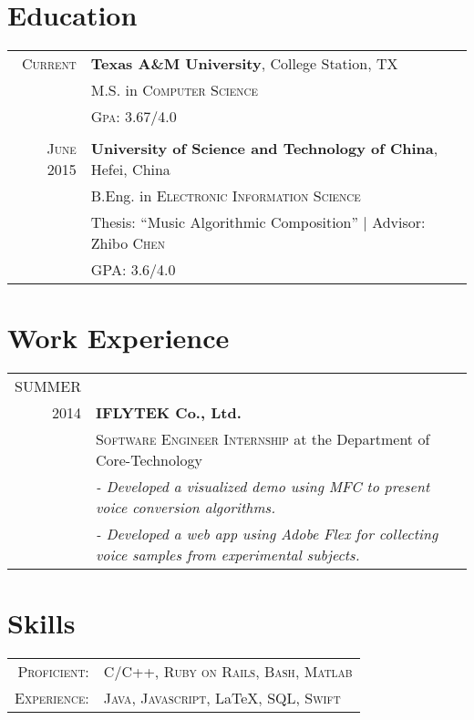 \documentclass[a4paper,10pt]{article}
\begin{document}
\section{Education}
\begin{tabular}{rl}	

    \textsc{Current} 
    &\textbf{Texas A\&M University}, College Station, TX\\
    & M.S. in \textsc{Computer Science}\\ 
    &\normalsize \textsc{Gpa}: 3.67/4.0
    \\ \\
    \textsc{June} 2015
    &\normalsize\textbf{University of Science and Technology of China}, Hefei, China\\
    & B.Eng. in \textsc{Electronic Information Science}\\ 
    & Thesis: ``Music Algorithmic Composition'' | \small Advisor: Zhibo \textsc{Chen}\\
    &\normalsize \textsc{GPA}: 3.6/4.0\\
    \end{tabular}



\section{Work Experience}
\begin{tabular}{rp{12cm}}	
    \textsc{SUMMER}\\
    \textsc{2014}
        &\textbf{IFLYTEK Co., Ltd.}\\
        &\textsc{Software Engineer Internship} \footnotesize{at the Department of Core-Technology}\\
        &\textit{- Developed a visualized demo using MFC to present voice conversion algorithms.}\\
        &\textit{- Developed a web app using Adobe Flex for collecting voice samples from experimental subjects.}
\end{tabular}




\section{Skills}
\begin{tabular}{rp{12cm}}
\textsc{Proficient:}
    & \textsc{C/C++}, \textsc{Ruby on Rails}, \textsc{Bash}, \textsc{Matlab}\\
\textsc{Experience:}
    & \textsc{Java}, \textsc{Javascript}, \LaTeX, \textsc{SQL}, \textsc{Swift}\\
\end{tabular}
\end{document}
